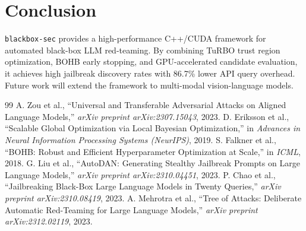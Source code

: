 \documentclass[11pt,a4paper]{article}
\begin{document}
\section{Conclusion}
\texttt{blackbox-sec} provides a high-performance C++/CUDA framework for automated black-box LLM red-teaming. By combining TuRBO trust region optimization, BOHB early stopping, and GPU-accelerated candidate evaluation, it achieves high jailbreak discovery rates with 86.7\% lower API query overhead. Future work will extend the framework to multi-modal vision-language models.

\begin{thebibliography}{99}
 A. Zou et al., ``Universal and Transferable Adversarial Attacks on Aligned Language Models,'' \emph{arXiv preprint arXiv:2307.15043}, 2023.
 D. Eriksson et al., ``Scalable Global Optimization via Local Bayesian Optimization,'' in \emph{Advances in Neural Information Processing Systems (NeurIPS)}, 2019.
 S. Falkner et al., ``BOHB: Robust and Efficient Hyperparameter Optimization at Scale,'' in \emph{ICML}, 2018.
 G. Liu et al., ``AutoDAN: Generating Stealthy Jailbreak Prompts on Large Language Models,'' \emph{arXiv preprint arXiv:2310.04451}, 2023.
 P. Chao et al., ``Jailbreaking Black-Box Large Language Models in Twenty Queries,'' \emph{arXiv preprint arXiv:2310.08419}, 2023.
 A. Mehrotra et al., ``Tree of Attacks: Deliberate Automatic Red-Teaming for Large Language Models,'' \emph{arXiv preprint arXiv:2312.02119}, 2023.
\end{thebibliography}
\end{document}
